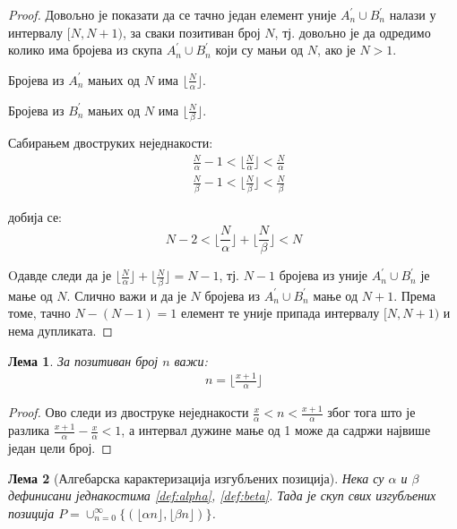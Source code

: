 \documentclass[a4paper]{article}
\newtheorem{lemma}{Лема}
\begin{document}
\begin{proof}
	Довољно је показати да се тачно један елемент уније $ A_{n}^{'} \cup B_{n}^{'} $ налази у интервалу $ [N,N+1) $, за сваки позитиван број $ N $, тј. довољно је да одредимо колико има бројева из скупа $ A_{n}^{'} \cup B_{n}^{'} $ који су мањи од $ N $, ако је $ N > 1 $.
	
	Бројева из $ A_{n}^{'} $ мањих од $ N $ има $ \lfloor \frac{N}{\alpha} \rfloor $.
	
	Бројева из $ B_{n}^{'} $ мањих од $ N $ има $ \lfloor \frac{N}{\beta} \rfloor $.
	
	Сабирањем двоструких неједнакости:
		\begin{eqnarray*}
			&\frac{N}{\alpha} - 1 < \lfloor \frac{N}{\alpha} \rfloor < \frac{N}{\alpha}\\
			&\frac{N}{\beta} - 1 < \lfloor \frac{N}{\beta} \rfloor < \frac{N}{\beta}
		\end{eqnarray*}
	
	добија се:
		\begin{displaymath}
		N - 2 < \lfloor \frac{N}{\alpha} \rfloor + \lfloor \frac{N}{\beta} \rfloor < N
		\end{displaymath} 
	
	Oдавде следи да је $ \lfloor \frac{N}{\alpha} \rfloor + \lfloor \frac{N}{\beta} \rfloor = N - 1 $, тј. $ N - 1 $ бројева из уније $ A_{n}^{'} \cup B_{n}^{'} $ је мање од $ N $. Слично важи и да је $ N $ бројева из $ A_{n}^{'} \cup B_{n}^{'} $ мање од $ N + 1 $. Према томе, тачно $ N - (N - 1) = 1 $ елемент те уније припада интервалу $ [N,N+1) $ и нема дупликата.
\end{proof}

\begin{lemma}
	\label{lemma:n}
	За позитиван број $ n $ важи:
		\begin{eqnarray*}
			n = \lfloor \frac{x+1}{\alpha} \rfloor
		\end{eqnarray*}
\end{lemma}

\begin{proof}
	Ово следи из двоструке неједнакости $ \frac{x}{\alpha}<n<\frac{x+1}{\alpha} $ због тога што је разлика $ \frac{x+1}{\alpha} - \frac{x}{\alpha} < 1 $, а интервал дужине мање од 1 може да садржи највише један цели број.
\end{proof}

\begin{lemma}[Алгебарска карактеризација изгубљених позиција] Нека су $ \alpha $ и $ \beta $ дефинисани једнакостима \eqref{def:alpha}, \eqref{def:beta}. Тада је скуп свих изгубљених позиција $ P = \cup_{n=0}^{\infty} \{(\lfloor \alpha n \rfloor, \lfloor \beta n \rfloor)\} $.
\end{lemma}
\end{document}
